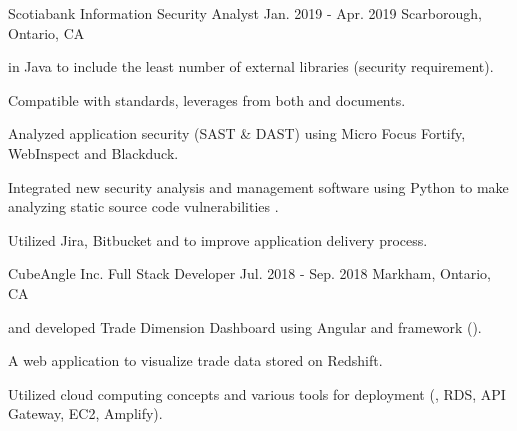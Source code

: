 \begin{cventries}
  \cventry
    {Scotiabank} %
    {Information Security Analyst} %
    {Jan. 2019 - Apr. 2019} %
    {Scarborough, Ontario, CA} %
    {
      \begin{cvitems} %
        \item { in Java  to include the least number of external libraries (security requirement).}
          \begin{cvsubitems}
            \item {Compatible with  standards, leverages from both  and  documents.}
          \end{cvsubitems}
        \item {Analyzed application security (SAST \& DAST) using Micro Focus Fortify, WebInspect and Blackduck.}
        \item {Integrated new security analysis and management software using Python to make analyzing static source code vulnerabilities .}
          \begin{cvsubitems}
            \item {Utilized Jira, Bitbucket and  to improve application delivery process.}
          \end{cvsubitems}
      \end{cvitems}
    }

  \cventry
    {CubeAngle Inc.} %
    {Full Stack Developer} %
    {Jul. 2018 - Sep. 2018} %
    {Markham, Ontario, CA} %
    {
      \begin{cvitems} %
        \item { and developed Trade Dimension Dashboard using Angular and  framework ().}
          \begin{cvsubitems}
            \item {A  web application to visualize trade data stored on  Redshift.}
          \end{cvsubitems}
        \item {Utilized cloud computing concepts and various  tools for deployment (, RDS, API Gateway,  EC2, Amplify).}
      \end{cvitems}
    }


\end{cventries}
